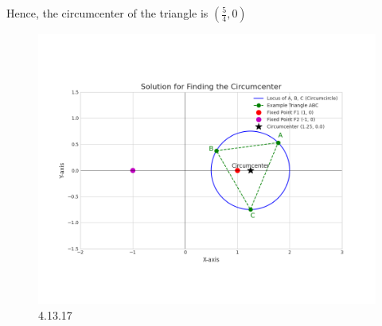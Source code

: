 \documentclass[journal]{IEEEtran}
\begin{document}
Hence, the circumcenter of the triangle is $(\frac{5}{4}, 0)$
\begin{figure}[H]
    \centering
    \includegraphics[width=0.85\columnwidth]{figs/graph9.png}
    \caption{4.13.17}
    \label{fig:placeholder}
\end{figure}
\end{document}
